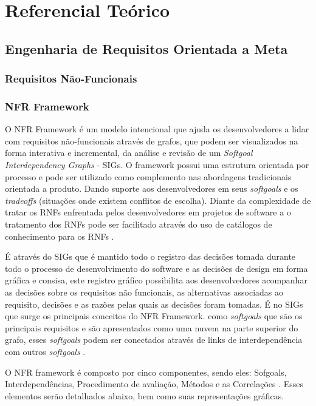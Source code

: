 \chapter[Referencial Teórico]{Referencial Teórico}

\section{Engenharia de Requisitos Orientada a Meta}

\subsection{Requisitos Não-Funcionais}

\subsection{NFR Framework}

O NFR Framework é um modelo intencional que ajuda os desenvolvedores  a  lidar com requisitos não-funcionais através de grafos, que podem ser visualizados na forma interativa e incremental, da análise e revisão de um \textit{Softgoal Interdependency Graphs} - SIGs. O framework possui uma estrutura orientada por processo e pode ser utilizado como complemento nas abordagens tradicionais orientada a produto. Dando suporte aos desenvolvedores em seus \textit{softgoals} e os \textit{tradeoffs} (situações onde existem conflitos de escolha). Diante da complexidade de tratar os RNFs enfrentada pelos desenvolvedores em projetos de software a o tratamento dos RNFs	pode ser facilitado através do uso de catálogos de conhecimento para os RNFs \cite{chung2012non}. 


É através do SIGs que é mantido todo o registro das decisões tomada durante todo o processo de desenvolvimento do software e as decisões de design em forma gráfica e consisa, este registro gráfico possibilita aos desenvolvedores acompanhar as decisões sobre os requisitos não funcionais, as alternativas associadas  ao requisito, decisões e as razões pelas quais as decisões foram tomadas. É no SIGs que surge os principais conceitos do NFR Framework. como \textit{softgoals} que são os principais requisitos e são apresentados como uma nuvem na parte superior do grafo, esses \textit{softgoals} podem ser conectados através de links de interdependência com outros \textit{softgoals} \cite{chung2012non}.

O NFR framework é composto por cinco componentes, sendo eles: Sofgoals, Interdependências, Procedimento de avaliação, Métodos e as Correlações \cite{chung2012non}. Esses elementos serão detalhados abaixo, bem como suas representações gráficas. 

